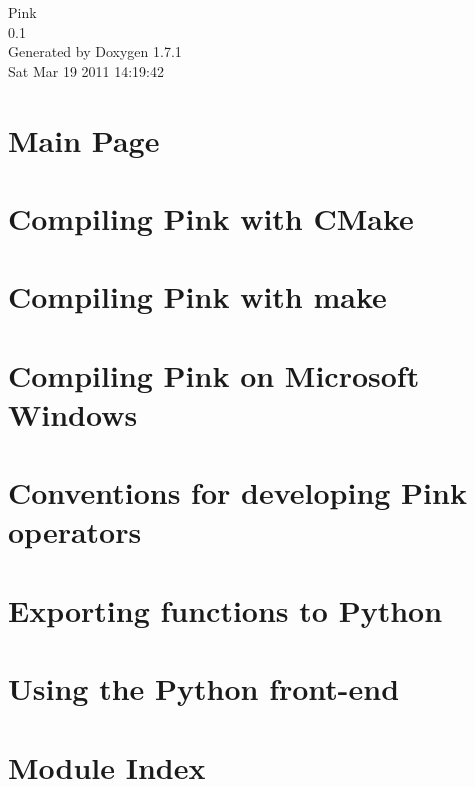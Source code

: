 \documentclass[a4paper]{book}
\begin{document}
\begin{titlepage}
\vspace*{7cm}
\begin{center}
{\Large Pink \\[1ex]\large 0.1 }\\
\vspace*{1cm}
{\large Generated by Doxygen 1.7.1}\\
\vspace*{0.5cm}
{\small Sat Mar 19 2011 14:19:42}\\
\end{center}
\end{titlepage}
\clearemptydoublepage
{}
\tableofcontents
\clearemptydoublepage
{}
\chapter{Main Page}
\label{index}

\chapter{Compiling Pink with CMake}
\label{compiling_cmake}

\chapter{Compiling Pink with make}
\label{compiling_make}

\chapter{Compiling Pink on Microsoft Windows}
\label{compiling_windows}

\chapter{Conventions for developing Pink operators}
\label{dev_conventions}

\chapter{Exporting functions to Python}
\label{python_export}

\chapter{Using the Python front-\/end}
\label{using_python}

\chapter{Module Index}

\end{document}
